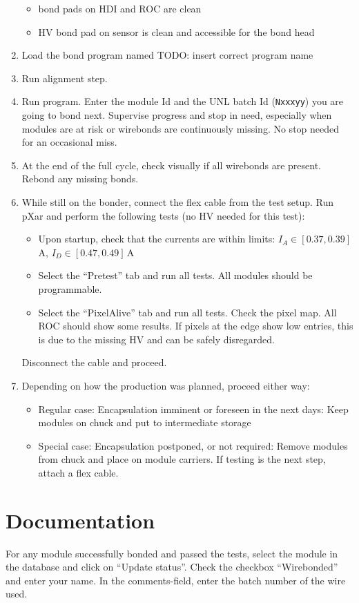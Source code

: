 \documentclass[12pt]{unlsilabsop}
\begin{document}
\begin{enumerate}
\begin{itemize}
        \item bond pads on HDI and ROC are clean
        \item HV bond pad on sensor is clean and accessible for the bond head
    \end{itemize}
    \item Load the bond program named TODO: insert correct program name
    \item Run alignment step.
    \item Run program. Enter the module Id and the UNL batch Id (\texttt{Nxxxyy}) you are going to bond next. Supervise progress and stop in need, especially when modules are at risk or wirebonds are continuously missing. No stop needed for an occasional miss.
    \item At the end of the full cycle, check visually if all wirebonds are present. Rebond any missing bonds.
    \item While still on the bonder, connect the flex cable from the test setup. Run pXar and perform the following tests (no HV needed for this test):
    \begin{itemize}
        \item Upon startup, check that the currents are within limits: $I_A\in[0.37,0.39]\,$A, $I_D\in[0.47,0.49]\,$A
        \item Select the ``Pretest'' tab and run all tests. All modules should be programmable.
        \item Select the ``PixelAlive'' tab and run all tests. Check the pixel map. All ROC should show some results. If pixels at the edge show low entries, this is due to the missing HV and can be safely disregarded.
    \end{itemize}
    Disconnect the cable and proceed.
    \item Depending on how the production was planned, proceed either way:
    \begin{itemize}
        \item Regular case: Encapsulation imminent or foreseen in the next days: Keep modules on chuck and put to intermediate storage
        \item Special case: Encapsulation postponed, or not required: Remove modules from chuck and place on module carriers. If testing is the next step, attach a flex cable.
    \end{itemize}
\end{enumerate}

\section{Documentation}
For any module successfully bonded and passed the tests, select the module in the database and click on ``Update status''. Check the checkbox ``Wirebonded'' and enter your name. In the comments-field, enter the batch number of the wire used.
\end{document}
